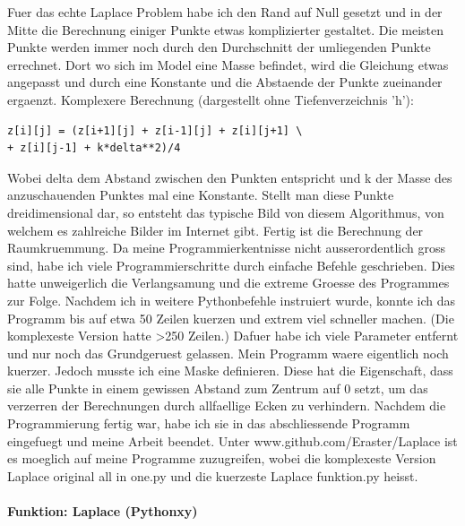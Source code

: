 \documentclass[pdftex,12pt,a4paper]{article}
\begin{document}
Fuer das echte Laplace Problem habe ich den Rand auf Null gesetzt und in der Mitte die Berechnung einiger Punkte etwas komplizierter gestaltet.
Die meisten Punkte werden immer noch durch den Durchschnitt der umliegenden Punkte errechnet.
Dort wo sich im Model eine Masse befindet, wird die Gleichung etwas angepasst und durch eine Konstante und die Abstaende der Punkte zueinander ergaenzt.
Komplexere Berechnung (dargestellt ohne Tiefenverzeichnis 'h'):
\begin{lstlisting}
z[i][j] = (z[i+1][j] + z[i-1][j] + z[i][j+1] \
+ z[i][j-1] + k*delta**2)/4  
\end{lstlisting}
Wobei delta dem Abstand zwischen den Punkten entspricht und k der Masse des anzuschauenden Punktes mal eine Konstante. Stellt man diese Punkte dreidimensional dar, so entsteht das typische Bild von diesem Algorithmus, von welchem es zahlreiche Bilder im Internet gibt.
Fertig ist die Berechnung der Raumkruemmung.
Da meine Programmierkentnisse nicht ausserordentlich gross sind, habe ich viele Programmierschritte durch einfache Befehle geschrieben.
Dies hatte unweigerlich die Verlangsamung und die extreme Groesse des Programmes zur Folge.
Nachdem ich in weitere Pythonbefehle instruiert wurde, konnte ich das Programm bis auf etwa 50 Zeilen kuerzen und extrem viel schneller machen.
(Die komplexeste Version hatte \textgreater250 Zeilen.)
Dafuer habe ich viele Parameter entfernt und nur noch das Grundgeruest gelassen.
Mein Programm waere eigentlich noch kuerzer. Jedoch musste ich eine Maske definieren.
Diese hat die Eigenschaft, dass sie alle Punkte in einem gewissen Abstand zum Zentrum auf 0 setzt, um das verzerren der Berechnungen durch allfaellige Ecken zu verhindern.
Nachdem die Programmierung fertig war, habe ich sie in das abschliessende Programm eingefuegt und meine Arbeit beendet.
Unter www.github.com/Eraster/Laplace
ist es moeglich auf meine Programme zuzugreifen, wobei die komplexeste Version 
Laplace original all in one.py 
und die kuerzeste
Laplace funktion.py
heisst.


\paragraph {Funktion: Laplace (Pythonxy)}
\end{document}
